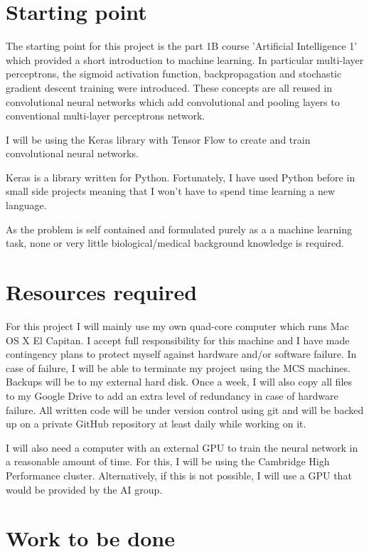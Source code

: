 \documentclass[12pt,a4paper,twoside]{article}
\begin{document}
\section*{Starting point}
  
The starting point for this project is the part 1B course 'Artificial Intelligence 1'  which provided a short introduction to machine learning. In particular multi-layer perceptrons, the sigmoid activation function, backpropagation and stochastic gradient descent training were introduced. These concepts are all reused in convolutional neural networks which add convolutional and pooling layers to conventional multi-layer perceptrons network.

I will be using the Keras library with Tensor Flow to create and train convolutional neural networks.

Keras is a library written for Python. Fortunately, I have used Python before in small side projects meaning that I won't have to spend time learning a new language.

As the problem is self contained and formulated purely as a a machine learning task, none or very little biological/medical background knowledge is required.

\section*{Resources required}

For this project I will mainly use my own quad-core computer which
runs Mac OS X El Capitan. I accept full responsibility for this machine and I have made contingency plans to protect myself against hardware and/or software failure. In case of failure, I will be able to terminate my project using the MCS machines.  Backups will be to my external hard disk. Once a week, I will also copy all files to my Google Drive to add an extra level of redundancy in case of hardware failure. All written code will be under version control using git and will be backed up on a private GitHub repository at least daily while working on it. 

I will also need a computer with an external GPU to train the neural network in a reasonable amount of time. For this, I will be using the Cambridge High Performance cluster. Alternatively, if this is not possible, I will use a GPU that would be provided by the AI group.

\section*{Work to be done}
\end{document}
